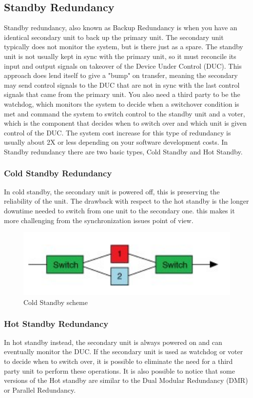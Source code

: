 \documentclass[./dissertation.tex]{subfiles}
\begin{document}
\subsection{Standby Redundancy}
Standby redundancy, also known as Backup Redundancy is when you have an identical secondary unit to back up the primary unit. The secondary unit typically does not monitor the system, but is there just as a spare. The standby unit is not usually kept in sync with the primary unit, so it must reconcile its input and output signals on takeover of the Device Under Control (DUC). This approach does lend itself to give a "bump" on transfer, meaning the secondary may send control signals to the DUC that are not in sync with the last control signals that came from the primary unit.
You also need a third party to be the watchdog, which monitors the system to decide when a switchover condition is met and command the system to switch control to the standby unit and a voter, which is the component that decides when to switch over and which unit is given control of the DUC. The system cost increase for this type of redundancy is usually about 2X or less depending on your software development costs. In Standby redundancy there are two basic types, Cold Standby and Hot Standby. \cite{bib12}

\subsubsection{Cold Standby Redundancy} In cold standby, the secondary unit is powered off, this is preserving the reliability of the unit. The drawback with respect to the hot standby is the longer downtime needed to switch from one unit to the secondary one. this makes it more challenging from the synchronization issues point of view.

\begin{figure}[h!]
\centering
  \includegraphics[scale = 0.50]{imgs/coldred.png}
  \caption{Cold Standby scheme }
  \label{fig:coldred}
\end{figure}
\subsubsection{Hot Standby Redundancy}
In hot standby instead, the secondary unit is always powered on and can eventually monitor the DUC. If the secondary unit is used as watchdog or voter to decide when to switch over, it is possible to eliminate the need for a third party unit to perform these operations. It is also possible to notice that some versions of the Hot standby are similar to the Dual Modular Redundancy (DMR) or Parallel Redundancy.
\end{document}
